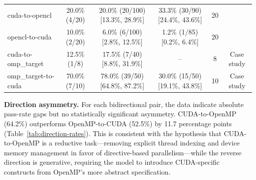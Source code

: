 \documentclass[conference]{IEEEtran}
\begin{document}
\begin{table}[t]
\begin{tabular}{@{}lccccc@{}}
cuda-to-opencl & 20.0\% (4/20) & 20.0\% (20/100) [13.3\%, 28.9\%] & 33.3\% (30/90) [24.4\%, 43.6\%] & 20 & \\ %
opencl-to-cuda & 10.0\% (2/20) & 6.0\% (6/100) [2.8\%, 12.5\%] & 1.2\% (1/85) [0.2\%, 6.4\%] & 20 & \\ %
cuda-to-omp\_target & 12.5\% (1/8) & 17.5\% (7/40) [8.8\%, 31.9\%] & -- & 8 & Case study \\ %
omp\_target-to-cuda & 70.0\% (7/10) & 78.0\% (39/50) [64.8\%, 87.2\%] & 30.0\% (15/50) [19.1\%, 43.8\%] & 10 & Case study \\ %
\bottomrule
\end{tabular}
\end{table}

\textbf{Direction asymmetry.} For each bidirectional pair, the data indicate absolute pass-rate gaps but no statistically significant asymmetry. CUDA-to-OpenMP (64.2\%) outperforms OpenMP-to-CUDA (52.5\%) by 11.7 percentage points (Table~\ref{tab:direction-rates}). This is consistent with the hypothesis that CUDA-to-OpenMP is a reductive task---removing explicit thread indexing and device memory management in favor of directive-based parallelism---while the reverse direction is generative, requiring the model to introduce CUDA-specific constructs from OpenMP's more abstract specification.
\end{document}
